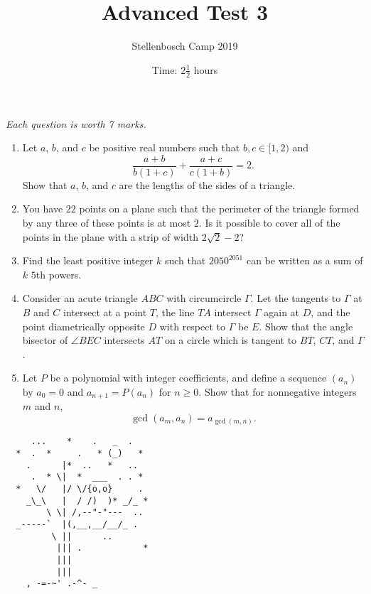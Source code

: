 \documentclass{article}
\title{Advanced Test 3}
\author{Stellenbosch Camp 2019}
\date{Time: $2\frac{1}{2}$ hours}
\begin{document}
\maketitle
\thispagestyle{empty}

\hfill\textit{Each question is worth 7 marks.}

\vfill
\vfill


\begin{enumerate}[1.]

\item %
Let $a$, $b$, and $c$ be positive real numbers such that $b, c \in [1,2)$ and
\[ \frac{a+b}{b(1+c)} +\frac{a+c}{c(1+b)} = 2. \]
Show that $a$, $b$, and $c$ are the lengths of the sides of a triangle.


\vfill

\item %
You have $22$ points on a plane such that the perimeter of the triangle formed by any three of these points is at most $2$. Is it possible to cover all of the points in the plane with a strip of width $2\sqrt{2} - 2$? 


\vfill

\item %
Find the least positive integer $k$ such that $2050^{2051}$ can be written as a sum of $k$ $5$th powers.


\vfill

\item %
Consider an acute triangle $ABC$ with circumcircle $\Gamma$.
Let the tangents to $\Gamma$ at $B$ and $C$ intersect at a point $T$, the line $TA$ intersect $\Gamma$ again at $D$, and the point diametrically opposite $D$ with respect to $\Gamma$ be $E$.
Show that the angle bisector of $\angle BEC$ intersects $AT$ on a circle which is tangent to $BT$, $CT$, and $\Gamma$.


\vfill

\item %
Let $P$ be a polynomial with integer coefficients, and define a sequence $(a_n)$ by $a_0 = 0$ and $a_{n+1} = P(a_n)$ for $n \geq 0$.
Show that for nonnegative integers $m$ and $n$,
\[ \gcd(a_m,a_n) = a_{\gcd(m,n)}. \]


\end{enumerate}


\vfill
\vfill
\begin{center}
\begin{BVerbatim}
     ...    *    .   _  .
  *  .  *     .   * (_)   *
    .      |*  ..   *   ..
     .  * \|  *  ___  . . *
  *   \/   |/ \/{o,o}     .
    _\_\   |  / /)  )* _/_ *
        \ \| /,--"-"---  ..
  _-----`  |(,__,__/__/_ .
         \ ||      ..
          ||| .            *
          |||
          |||
    , -=-~' .-^- _
\end{BVerbatim}
\end{center}
\end{document}
